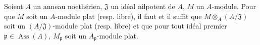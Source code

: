 \begin{corollary}[11.4.9]
\label{IV.11.4.9-fr}
Soient $A$ un anneau noethérien, $\mathfrak J$ un idéal nilpotent de $A$, $M$
un $A$-module. Pour que $M$ soit un $A$-module plat \textup{(resp.} libre), il faut et
il suffit que $M\otimes_A(A/\mathfrak J)$ soit un $(A/\mathfrak J)$-module
plat \textup{(resp.} libre) et que pour tout idéal premier
$\mathfrak p\in\operatorname{Ass}(A)$, $M_\mathfrak p$ soit un
$A_\mathfrak p$-module plat.
\end{corollary}

